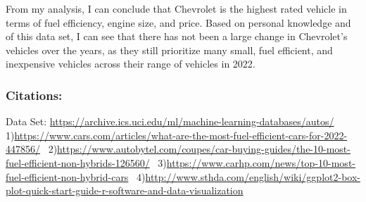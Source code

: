 \documentclass[
]{article}
\begin{document}
From my analysis, I can conclude that Chevrolet is the highest rated
vehicle in terms of fuel efficiency, engine size, and price. Based on
personal knowledge and of this data set, I can see that there has not
been a large change in Chevrolet's vehicles over the years, as they
still prioritize many small, fuel efficient, and inexpensive vehicles
across their range of vehicles in 2022.

\hypertarget{citations}{%
\subsubsection{Citations:}\label{citations}}

Data Set:
\url{https://archive.ics.uci.edu/ml/machine-learning-databases/autos/}\\
1)\url{https://www.cars.com/articles/what-are-the-most-fuel-efficient-cars-for-2022-447856/}
~2)\url{https://www.autobytel.com/coupes/car-buying-guides/the-10-most-fuel-efficient-non-hybrids-126560/}
~3)\url{https://www.carhp.com/news/top-10-most-fuel-efficient-non-hybrid-cars}
~4)\url{http://www.sthda.com/english/wiki/ggplot2-box-plot-quick-start-guide-r-software-and-data-visualization}\\
\end{document}
